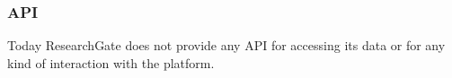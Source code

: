 \subsubsection*{API}
Today ResearchGate does not provide any API for accessing its data or for any kind of interaction with the platform.


